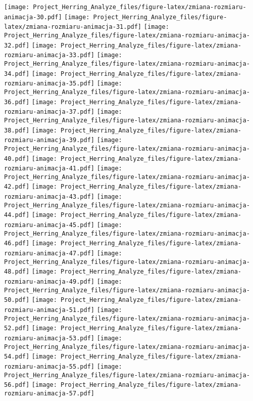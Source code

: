 \documentclass[]{article}
\begin{document}
\texttt{[image: Project\_Herring\_Analyze\_files/figure-latex/zmiana-rozmiaru-animacja-30.pdf]}
\texttt{[image: Project\_Herring\_Analyze\_files/figure-latex/zmiana-rozmiaru-animacja-31.pdf]}
\texttt{[image: Project\_Herring\_Analyze\_files/figure-latex/zmiana-rozmiaru-animacja-32.pdf]}
\texttt{[image: Project\_Herring\_Analyze\_files/figure-latex/zmiana-rozmiaru-animacja-33.pdf]}
\texttt{[image: Project\_Herring\_Analyze\_files/figure-latex/zmiana-rozmiaru-animacja-34.pdf]}
\texttt{[image: Project\_Herring\_Analyze\_files/figure-latex/zmiana-rozmiaru-animacja-35.pdf]}
\texttt{[image: Project\_Herring\_Analyze\_files/figure-latex/zmiana-rozmiaru-animacja-36.pdf]}
\texttt{[image: Project\_Herring\_Analyze\_files/figure-latex/zmiana-rozmiaru-animacja-37.pdf]}
\texttt{[image: Project\_Herring\_Analyze\_files/figure-latex/zmiana-rozmiaru-animacja-38.pdf]}
\texttt{[image: Project\_Herring\_Analyze\_files/figure-latex/zmiana-rozmiaru-animacja-39.pdf]}
\texttt{[image: Project\_Herring\_Analyze\_files/figure-latex/zmiana-rozmiaru-animacja-40.pdf]}
\texttt{[image: Project\_Herring\_Analyze\_files/figure-latex/zmiana-rozmiaru-animacja-41.pdf]}
\texttt{[image: Project\_Herring\_Analyze\_files/figure-latex/zmiana-rozmiaru-animacja-42.pdf]}
\texttt{[image: Project\_Herring\_Analyze\_files/figure-latex/zmiana-rozmiaru-animacja-43.pdf]}
\texttt{[image: Project\_Herring\_Analyze\_files/figure-latex/zmiana-rozmiaru-animacja-44.pdf]}
\texttt{[image: Project\_Herring\_Analyze\_files/figure-latex/zmiana-rozmiaru-animacja-45.pdf]}
\texttt{[image: Project\_Herring\_Analyze\_files/figure-latex/zmiana-rozmiaru-animacja-46.pdf]}
\texttt{[image: Project\_Herring\_Analyze\_files/figure-latex/zmiana-rozmiaru-animacja-47.pdf]}
\texttt{[image: Project\_Herring\_Analyze\_files/figure-latex/zmiana-rozmiaru-animacja-48.pdf]}
\texttt{[image: Project\_Herring\_Analyze\_files/figure-latex/zmiana-rozmiaru-animacja-49.pdf]}
\texttt{[image: Project\_Herring\_Analyze\_files/figure-latex/zmiana-rozmiaru-animacja-50.pdf]}
\texttt{[image: Project\_Herring\_Analyze\_files/figure-latex/zmiana-rozmiaru-animacja-51.pdf]}
\texttt{[image: Project\_Herring\_Analyze\_files/figure-latex/zmiana-rozmiaru-animacja-52.pdf]}
\texttt{[image: Project\_Herring\_Analyze\_files/figure-latex/zmiana-rozmiaru-animacja-53.pdf]}
\texttt{[image: Project\_Herring\_Analyze\_files/figure-latex/zmiana-rozmiaru-animacja-54.pdf]}
\texttt{[image: Project\_Herring\_Analyze\_files/figure-latex/zmiana-rozmiaru-animacja-55.pdf]}
\texttt{[image: Project\_Herring\_Analyze\_files/figure-latex/zmiana-rozmiaru-animacja-56.pdf]}
\texttt{[image: Project\_Herring\_Analyze\_files/figure-latex/zmiana-rozmiaru-animacja-57.pdf]}
\end{document}
